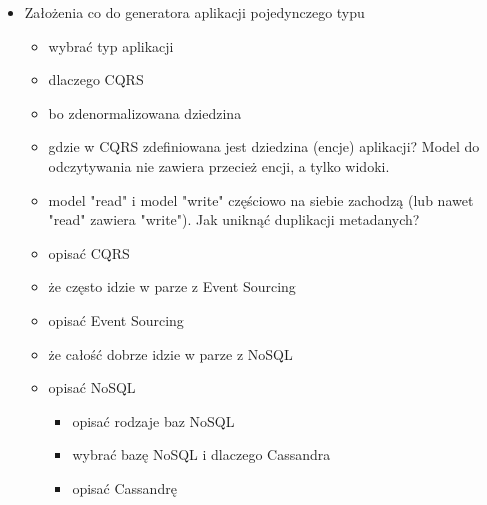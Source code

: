 \begin{itemize}
  \item Założenia co do generatora aplikacji pojedynczego typu
   \begin{itemize}
    \item wybrać typ aplikacji
    \item dlaczego CQRS
     \item bo zdenormalizowana dziedzina
     \item gdzie w CQRS zdefiniowana jest dziedzina (encje) aplikacji? Model do odczytywania nie zawiera przecież encji, a tylko widoki.
     \item model "read" i model "write" częściowo na siebie zachodzą (lub nawet "read" zawiera "write"). Jak uniknąć duplikacji metadanych?
    \item opisać CQRS
    \item że często idzie w parze z Event Sourcing
    \item opisać Event Sourcing
    \item że całość dobrze idzie w parze z NoSQL
    \item opisać NoSQL
     \begin{itemize}
      \item opisać rodzaje baz NoSQL
      \item wybrać bazę NoSQL i dlaczego Cassandra
      \item opisać Cassandrę
     \end{itemize}
   \end{itemize}
  

\end{itemize}
